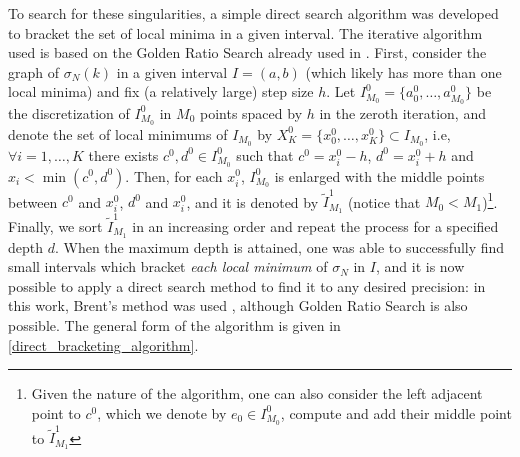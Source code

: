 To search for these singularities, a simple direct search algorithm was developed to bracket the set of local minima in a given interval. The iterative algorithm used is based on the Golden Ratio Search already used in \cite{alves2005method}. First, consider the graph of \(\sigma_N(k)\) in a given interval \(I=(a, b)\) (which likely has more than one local minima) and fix (a relatively large) step size \(h\). Let \(I_{M_0}^0 = \{a_0^0, \dots, a_{M_0}^0\}\) be the discretization of \(I_{M_0}^0\) in \({M_0}\) points spaced by \(h\) in the zeroth iteration, and denote the set of local minimums of \(I_{M_0}\) by \(X^0_K = \{x_0^0, \dots, x_K^0\} \subset I_{M_0}\), i.e, \(\forall i = 1,\dots,K\) there exists \(c^0, d^0 \in I_{M_0}^0\) such that \(c^0 = x_i^0 - h\), \(d^0 = x_i^0 + h\) and \(x_i < \min(c^0, d^0) \). Then, for each \(x_i^0\), \(I_{M_0}^0\) is enlarged with the middle points between \(c^0\) and \(x_i^0\), \(d^0\) and \(x_i^0\), and it is denoted by \(\tilde{I}_{M_1}^1\) (notice that \(M_0 < M_1\))\footnote{Given the nature of the algorithm, one can also consider the left adjacent point to \(c^0\), which we denote by \(e_0 \in I^0_{M_0}\), compute and add their middle point to \(\tilde{I}_{M_1}^1\)}. Finally, we sort \(\tilde{I}_{M_1}^1\) in an increasing order and repeat the process for a specified depth \(d\). When the maximum depth is attained, one was able to successfully find small intervals which bracket \textit{each local minimum} of \(\sigma_N\) in \(I\), and it is now possible to apply a direct search method to find it to any desired precision: in this work, Brent's method was used \cite{brent1971algorithm}, although Golden Ratio Search is also possible. The general form of the algorithm is given in \ref{direct_bracketing_algorithm}.

